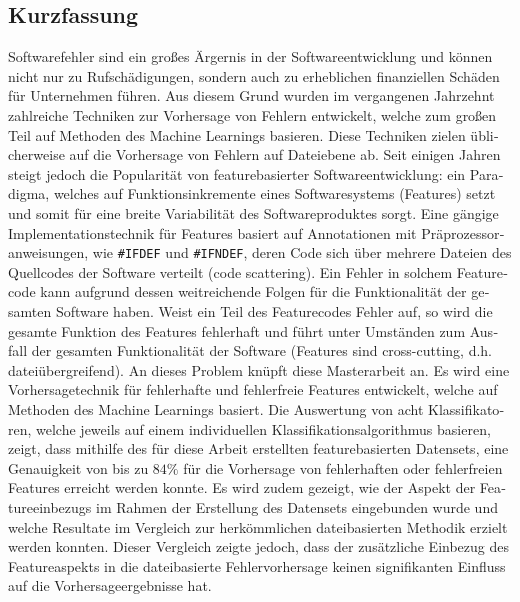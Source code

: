 
\begin{otherlanguage}{ngerman}
    \section*{Kurzfassung}

Softwarefehler sind ein großes Ärgernis in der Softwareentwicklung und können nicht nur zu Rufschädigungen, sondern auch zu erheblichen finanziellen Schäden für Unternehmen führen. Aus diesem Grund wurden im vergangenen Jahrzehnt zahlreiche Techniken zur Vorhersage von Fehlern entwickelt, welche zum großen Teil auf Methoden des Machine Learnings basieren. Diese Techniken zielen üblicherweise auf die Vorhersage von Fehlern auf Dateiebene ab. Seit einigen Jahren steigt jedoch die Popularität von featurebasierter Softwareentwicklung: ein Paradigma, welches auf Funktionsinkremente eines Softwaresystems (Features) setzt und somit für eine breite Variabilität des Softwareproduktes sorgt. Eine gängige Implementationstechnik für Features basiert auf Annotationen mit Präprozessoranweisungen, wie \texttt{\#IFDEF} und \texttt{\#IFNDEF}, deren Code sich über mehrere Dateien des Quellcodes der Software verteilt (\glqq code scattering\grqq). Ein Fehler in solchem Featurecode kann aufgrund dessen weitreichende Folgen für die Funktionalität der gesamten Software haben. Weist ein Teil des Featurecodes Fehler auf, so wird die gesamte Funktion des Features fehlerhaft und führt unter Umständen zum Ausfall der gesamten Funktionalität der Software (Features sind \glqq cross-cutting\grqq, d.h. dateiübergreifend). An dieses Problem knüpft diese Masterarbeit an. Es wird eine Vorhersagetechnik für fehlerhafte und fehlerfreie Features entwickelt, welche auf Methoden des Machine Learnings basiert. Die Auswertung von acht Klassifikatoren, welche jeweils auf einem individuellen Klassifikationsalgorithmus basieren, zeigt, dass mithilfe des für diese Arbeit erstellten featurebasierten Datensets, eine Genauigkeit von bis zu $84\%$ für die Vorhersage von fehlerhaften oder fehlerfreien Features erreicht werden konnte. Es wird zudem gezeigt, wie der Aspekt der Featureeinbezugs im Rahmen der Erstellung des Datensets eingebunden wurde und welche Resultate im Vergleich zur herkömmlichen dateibasierten Methodik erzielt werden konnten. Dieser Vergleich zeigte jedoch, dass der zusätzliche Einbezug des Featureaspekts in die dateibasierte Fehlervorhersage keinen signifikanten Einfluss auf die Vorhersageergebnisse hat.

\end{otherlanguage}

